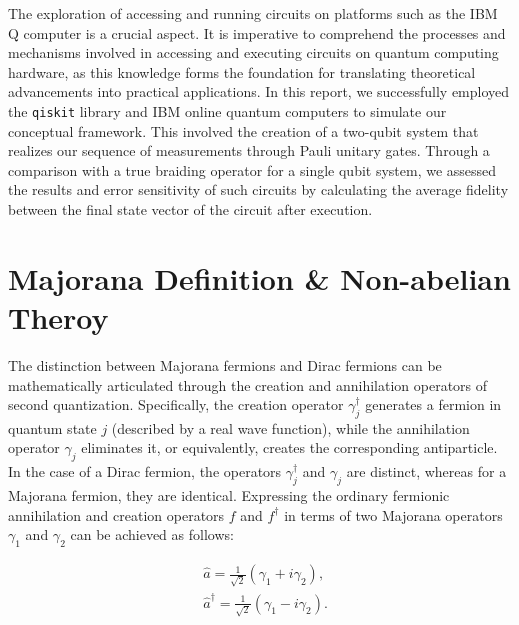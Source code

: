 \documentclass{article}
\def\c#1{\texttt{#1}}
\begin{document}
The exploration of accessing and running circuits on platforms such as the IBM Q computer is a crucial aspect. It is imperative to comprehend the processes and mechanisms involved in accessing and executing circuits on quantum computing hardware, as this knowledge forms the foundation for translating theoretical advancements into practical applications. In this report, we successfully employed the \c{qiskit} library and IBM online quantum computers to simulate our conceptual framework. This involved the creation of a two-qubit system that realizes our sequence of measurements through Pauli unitary gates. Through a comparison with a true braiding operator for a single qubit system, we assessed the results and error sensitivity of such circuits by calculating the average fidelity between the final state vector of the circuit after execution.

\section{Majorana Definition \& Non-abelian Theroy} %
\label{sec:Majorana Definition}
The distinction between Majorana fermions and Dirac fermions can be mathematically articulated through the creation and annihilation operators of second quantization. Specifically, the creation operator $\gamma_j^{\dagger}$ generates a fermion in quantum state $j$ (described by a real wave function), while the annihilation operator $\gamma_j$ eliminates it, or equivalently, creates the corresponding antiparticle. In the case of a Dirac fermion, the operators $\gamma_j^{\dagger}$ and $\gamma_j$ are distinct, whereas for a Majorana fermion, they are identical. Expressing the ordinary fermionic annihilation and creation operators $f$ and $f^{\dagger}$ in terms of two Majorana operators $\gamma_1$ and $\gamma_2$ can be achieved as follows:

$$
	\begin{aligned}
		 & \hat{a}=\frac{1}{\sqrt{2}}\left(\gamma_1+i \gamma_2\right),            \\
		 & \hat{a}^{\dagger}=\frac{1}{\sqrt{2}}\left(\gamma_1-i \gamma_2\right) .
		\label{eq:ferm as mf}
	\end{aligned}
$$
\end{document}
